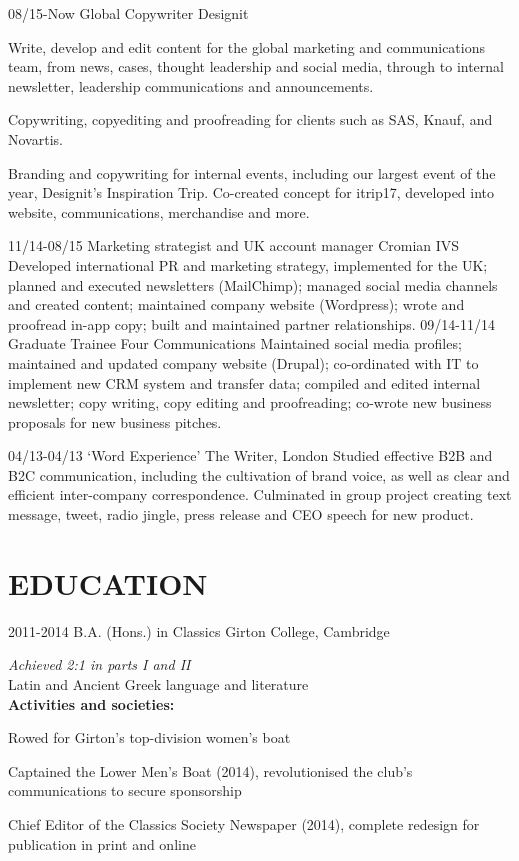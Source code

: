 \documentclass[]{friggeri-cv}
\begin{document}
\begin{entrylist}
	\entry
	{08/15-Now}
	{Global Copywriter}
	{Designit}
	{
		Write, develop and edit content for the global marketing and communications team, from news, cases, thought leadership and social media, through to internal newsletter, leadership communications and announcements.

		Copywriting, copyediting and proofreading for clients such as SAS, Knauf, and Novartis.

		Branding and copywriting for internal events, including our largest event of the year, Designit's Inspiration Trip. Co-created concept for itrip17, developed into website, communications, merchandise and more.
	}
	\entry
	{11/14-08/15}
	{Marketing strategist and UK account manager}
	{Cromian IVS}
	{
		Developed international PR and marketing strategy, implemented for the UK; planned and executed newsletters (MailChimp); managed social media channels and created content; maintained company website (Wordpress); wrote and proofread in-app copy; built and maintained partner relationships.
	}
	\entry
	{09/14-11/14}
	{Graduate Trainee}
	{Four Communications}
	{
		Maintained social media profiles; maintained and updated company website (Drupal); co-ordinated with IT to implement new CRM system and transfer data; compiled and edited internal newsletter; copy writing, copy editing and proofreading; co-wrote new business proposals for new business pitches.
	}
\end{entrylist}
\begin{entrylist}
	\entry
	{04/13-04/13}
	{‘Word Experience’}
	{The Writer, London}
	{
		Studied effective B2B and B2C communication, including the cultivation of brand voice, as well as clear and efficient inter-company correspondence. Culminated in group project creating text message, tweet, radio jingle, press release and CEO speech for new product.
	}
\end{entrylist}

\pagebreak

\section{EDUCATION}

\begin{entrylist}
	\entry
	{2011-2014}
	{B.A. (Hons.) in Classics}
	{Girton College, Cambridge}
	{\emph{Achieved 2:1 in parts I and II}
		\\

		Latin and Ancient Greek language and literature
		\\

		\textbf{Activities and societies:}

		Rowed for Girton's top-division women's boat

		Captained the Lower Men's Boat (2014), revolutionised the club's communications to secure sponsorship

		Chief Editor of the Classics Society Newspaper (2014), complete redesign for publication in print and online
	}
\end{entrylist}
\end{document}
